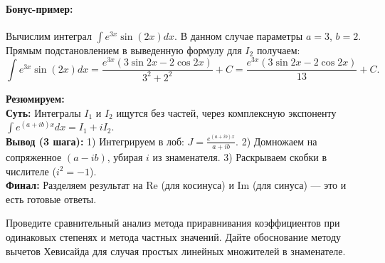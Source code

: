 \paragraph{Бонус-пример:} Вычислим интеграл $\int e^{3x} \sin(2x) dx$. 
В данном случае параметры $a = 3$, $b = 2$. Прямым подстановлением в выведенную формулу для $I_2$ получаем:
$$ \int e^{3x} \sin(2x) dx = \frac{e^{3x}(3\sin 2x - 2\cos 2x)}{3^2+2^2} + C = \frac{e^{3x}(3\sin 2x - 2\cos 2x)}{13} + C. $$



\begin{tcolorbox}[colback=gray!5, colframe=black, boxrule=0.5pt, arc=0pt]
\textbf{Резюмируем:} \\
\textbf{Суть:} Интегралы $I_1$ и $I_2$ ищутся без частей, через комплексную экспоненту $\int e^{(a+ib)x}dx=I_1+iI_2$. \\
\textbf{Вывод (3 шага):} 1) Интегрируем в лоб: $J=\frac{e^{(a+ib)x}}{a+ib}$. 2) Домножаем на сопряженное $(a-ib)$, убирая $i$ из знаменателя. 3) Раскрываем скобки в числителе ($i^2=-1$). \\
\textbf{Финал:} Разделяем результат на $\text{Re}$ (для косинуса) и $\text{Im}$ (для синуса) — это и есть готовые ответы.
\end{tcolorbox}




{Проведите сравнительный анализ метода приравнивания коэффициентов при одинаковых степенях и метода частных значений. Дайте обоснование методу вычетов Хевисайда для случая простых линейных множителей в знаменателе.}


